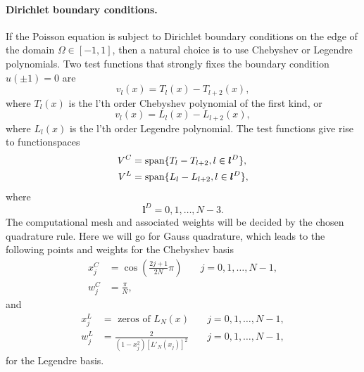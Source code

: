 \documentclass[%
oneside,                 %
final,                   %
10pt]{article}
\theoremstyle{definition}
\begin{document}
\paragraph{Dirichlet boundary conditions.}
\label{sec:dirichletpoisson}
If the Poisson equation is subject to Dirichlet boundary conditions on the edge of the domain $\Omega \in [-1, 1]$, then a natural choice is to use Chebyshev or Legendre polynomials. Two test functions that strongly fixes the boundary condition $u(\pm 1)=0$ are
\begin{equation}
v_l(x) = T_l(x) - T_{l+2}(x),
\end{equation}
where $T_l(x)$ is the l'th order Chebyshev polynomial of the first kind, or
\begin{equation}
v_l(x) = L_l(x) - L_{l+2}(x),
\label{eq:shen_legendre_basis}
\end{equation}
where $L_l(x)$ is the l'th order Legendre polynomial. The test functions give rise to functionspaces
\begin{align}
V^C &= \text{span}\{T_l-T_{l+2}, l \in \boldsymbol{l}^D\}, \label{eq:chebdirichlet} \\ 
V^L &= \text{span}\{L_l-L_{l+2}, l \in \boldsymbol{l}^D\}, \label{eq:legdirichlet}
\end{align}
where
\begin{equation}
\boldsymbol{l}^D = 0, 1, \ldots, N-3.
\end{equation}
The computational mesh and associated weights will be decided by the chosen quadrature rule. Here we will go for Gauss quadrature, which leads to the following points and weights for the Chebyshev basis
\begin{align}
x_j^C &= \cos \left( \frac{2j+1}{2N}\pi \right) \quad &j=0,1,\ldots, N-1, \\ 
w_j^C &= \frac{\pi}{N},
\end{align}
and
\begin{align}
x_j^L &= \text{ zeros of }L_{N}(x) \quad &j=0,1,\ldots, N-1, \\ 
w_j^L &= \frac{2}{(1-x_j^2)[L'_{N}(x_j)]^2} \quad &j=0,1,\ldots, N-1,
\end{align}
for the Legendre basis.
\end{document}
